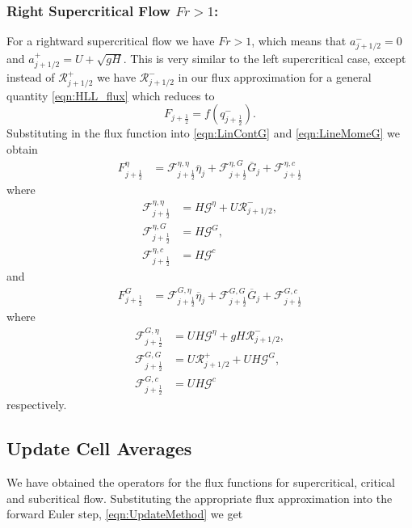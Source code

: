 \subsubsection{Right Supercritical Flow $Fr > 1$:}
For a rightward supercritical flow we have $ Fr > 1 $, which means that $a^-_{j+ 1/2} = 0$ and $a^+_{j+ 1/2} =  U + \sqrt{g H}$. This is very similar to the left supercritical case, except instead of $\mathcal{R}^+_{j+1/2}$ we have $\mathcal{R}^-_{j+1/2}$ in our flux approximation for a general quantity \eqref{eqn:HLL_flux} which reduces to
\begin{equation*}
F_{j+\frac{1}{2}} = f\left(q^-_{j+\frac{1}{2}}\right).
\end{equation*}
Substituting in the flux function into \eqref{eqn:LinContG} and \eqref{eqn:LineMomeG} we obtain
	\begin{align*}
	F^\eta_{j+\frac{1}{2}} &= \mathcal{F}^{\eta, \eta}_{j+\frac{1}{2}} \overline{\eta}_{j} + \mathcal{F}^{\eta, G}_{j+\frac{1}{2}} \overline{G}_{j} + \mathcal{F}^{\eta, c}_{j+\frac{1}{2}}
	\end{align*}
	where
	\begin{align*}
	\mathcal{F}^{\eta, \eta}_{j+\frac{1}{2}} &=  H \mathcal{G}^{\eta} + U \mathcal{R}^-_{j+1/2},\\
	\mathcal{F}^{\eta, G}_{j+\frac{1}{2}} &=  H \mathcal{G}^G,\\
	\mathcal{F}^{\eta, c}_{j+\frac{1}{2}} &=  H\mathcal{G}^c
	\end{align*}
and
	\begin{align*}
	F^G_{j+\frac{1}{2}} &= \mathcal{F}^{G, \eta}_{j+\frac{1}{2}} \overline{\eta}_{j} + \mathcal{F}^{G, G}_{j+\frac{1}{2}} \overline{G}_{j} + \mathcal{F}^{G, c}_{j+\frac{1}{2}}
	\end{align*}
	where
	\begin{align*}
	\mathcal{F}^{G, \eta}_{j+\frac{1}{2}} &=  UH \mathcal{G}^{\eta} + gH \mathcal{R}^-_{j+1/2},\\
	\mathcal{F}^{G, G}_{j+\frac{1}{2}} &=  U\mathcal{R}^+_{j+1/2}  +  UH \mathcal{G}^G, \\
	\mathcal{F}^{G, c}_{j+\frac{1}{2}} &=  UH\mathcal{G}^c
	\end{align*}
respectively.



\subsection{Update Cell Averages}
We have obtained the operators for the flux functions for supercritical, critical and subcritical flow. Substituting the appropriate flux approximation into the forward Euler step, \eqref{eqn:UpdateMethod} we get

